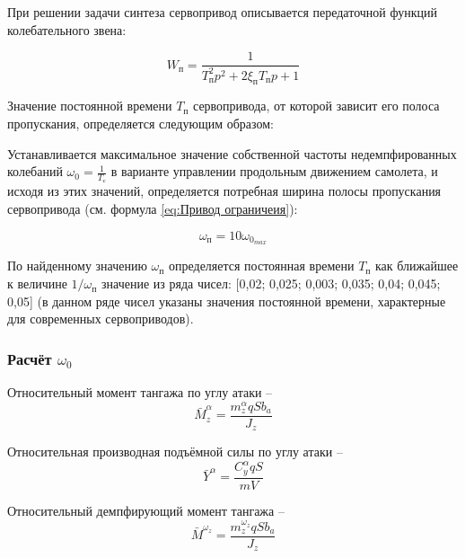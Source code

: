     При решении задачи синтеза сервопривод описывается передаточной функций колебательного звена:
    
    \begin{equation}
    \label{eq:Привод ограничеия}
        W_{\text{п}}=\frac{1}{T_\text{п}^2p^2+2\xi_\text{п}T_\text{п}p+1}
    \end{equation}
    
    Значение постоянной времени  $T_\text{п}$ сервопривода, от которой зависит его полоса пропускания, определяется следующим образом:
    
    Устанавливается максимальное значение собственной частоты  недемпфированных колебаний $\omega_0=\frac{1}{T_{\text{с}}}$ в варианте управлении продольным движением самолета, и исходя из этих значений, определяется потребная ширина полосы пропускания сервопривода (см. формула \ref{eq:Привод ограничеия}):
    
    \begin{equation}
        \label{eq:Собственная частота привода}
        \omega_\text{п}=10 \omega_{0_{max}}
    \end{equation}
    
    По найденному значению $\omega_\text{п}$ определяется постоянная времени  $T_\text{п}$ как ближайшее к величине $1/ \omega_\text{п}$  значение из ряда чисел: [0,02; 0,025; 0,003; 0,035; 0,04; 0,045; 0,05] (в данном ряде чисел указаны значения постоянной времени, характерные для современных сервоприводов).
    
    \subsubsection{Расчёт $\omega_0$}
    
    Относительный момент тангажа по углу атаки -- 
    \begin{equation}
        \label{eq:Относительный момент тангажа по углу атаки}
        \bar{M}_z^{\alpha} = \frac{m_z^{\alpha}qSb_a}{J_z}
    \end{equation}
    
    Относительная производная подъёмной силы по углу атаки --
    \begin{equation}
        \label{eq:Относительный момент тангажа по угловой скорости тангажа}
        \bar{Y}^\alpha=\frac{C_y^\alpha qS}{mV}
    \end{equation}
    
    Относительный демпфирующий момент тангажа --
    \begin{equation}
        \label{eq:Относительный демпфирующий момент тангажа}
        \bar{M}^{\omega_z}=\frac{m_z^{\omega_z} qS b_a}{J_z}
    \end{equation}
    
